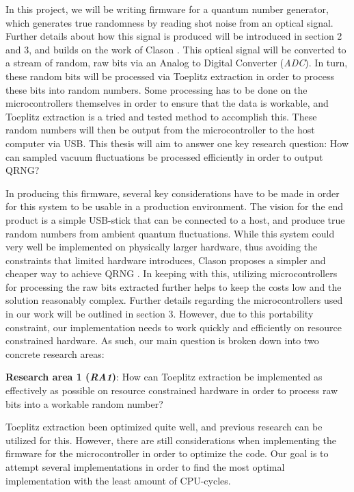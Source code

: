 In this project, we will be writing firmware for a quantum number generator, which generates true randomness by reading shot noise from an optical signal. Further details about how this signal is produced will be introduced in section 2 and 3, and builds on the work of Clason \cite{Clason2023}. This optical signal will be converted to a stream of random, raw bits via an Analog to Digital Converter (\emph{ADC}). In turn, these random bits will be processed via Toeplitz extraction \cite{toeplitz} in order to process these bits into random numbers. Some processing has to be done on the microcontrollers themselves in order to ensure that the data is workable, and Toeplitz extraction is a tried and tested method to accomplish this. These random numbers will then be output from the microcontroller to the host computer via USB. This thesis will aim to answer one key research question: How can sampled vacuum fluctuations be processed efficiently in order to output QRNG?

In producing this firmware, several key considerations have to be made in order for this system to be usable in a production environment. The vision for the end product is a simple USB-stick that can be connected to a host, and produce true random numbers from ambient quantum fluctuations. While this system could very well be implemented on physically larger hardware, thus avoiding the constraints that limited hardware introduces, Clason proposes a simpler and cheaper way to achieve QRNG \cite{Clason2023}. In keeping with this, utilizing microcontrollers for processing the raw bits extracted further helps to keep the costs low and the solution reasonably complex. Further details regarding the microcontrollers used in our work will be outlined in section 3. However, due to this portability constraint, our implementation needs to work quickly and efficiently on resource constrained hardware. As such, our main question is broken down into two concrete research areas:

\textbf{Research area 1 (\emph{RA1})}: How can Toeplitz extraction be implemented as effectively as possible on resource constrained hardware in order to process raw bits into a workable random number?

Toeplitz extraction been optimized quite well, and previous research can be utilized for this. However, there are still considerations when implementing the firmware for the microcontroller in order to optimize the code. Our goal is to attempt several implementations in order to find the most optimal implementation with the least amount of CPU-cycles.

